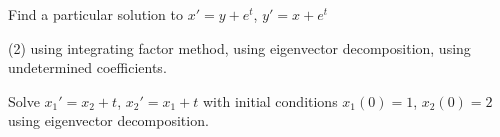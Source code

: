 \begin{exercise}
Find a particular solution to $x' = y + e^t$, $y' = x +e^t$
\begin{tasks}(2)
\task using integrating factor method,
\task using eigenvector decomposition,
\task using undetermined coefficients.
\end{tasks}
\end{exercise}

\begin{exercise}
Solve
$x_1' = x_2 + t$, $x_2' = x_1 +t$ with initial conditions
$x_1(0) = 1$, $x_2(0) = 2$
using eigenvector decomposition.
\end{exercise}

